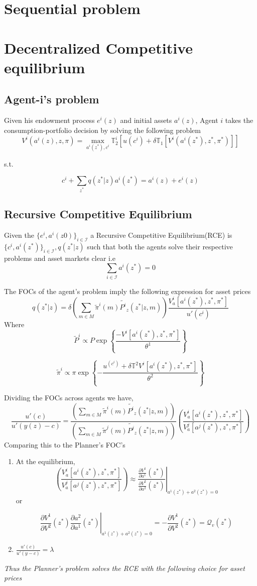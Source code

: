\documentclass[12pt]{article}
\begin{document}
\section{Sequential problem}
\section{Decentralized Competitive equilibrium}
\subsection{Agent-i's problem}
Given his endowment process $e^i(z)$ and initial assets $a^i(z)$, Agent $i$ takes the consumption-portfolio decision by solving the following problem
\[V^i(a^i(z),z,\pi)=\max_{a^i(z^*),c^i}\mathbb{T}^i_2\left[ u(c^i)+\delta\mathbb{T}_1\left[V^i(a^i(z^*),z^*,\pi^*)\right]\right]\]

s.t.

\[c^i+\sum_{z^*} q(z^* | z)a^i(z^*)=a^i(z)+e^i(z)\]

\subsection{Recursive Competitive Equilibrium}
\noindent Given the $\{e^i,a^i(z0)\}_{i\in\mathcal{I}}$ a Recursive Competitive Equilibrium(RCE) is $\{c^i,a^i(z^*)\}_{i \in \mathcal{I}}, q(z^*|z)$ such that both the agents solve their respective problems and asset markets clear i.e
\[\sum_{i \in \mathcal{I}}a^i(z^*)=0\]

\noindent The FOCs of the agent's problem imply the following expression for asset prices 
\[q(z^*|z)=\delta \left(\sum_{m \in M}\tilde{\pi}^i(m)\tilde{P^i}_z(z^* |z,m)\right)\frac{V^i_a[a^i(z^*),z^*,\pi^*]}{u'(c^i)}\]
Where
\[\tilde{P}^i  \propto P\exp\left\{\frac{-V^i[a^i(z^*),z^*,\pi^*]}{\theta^1}\right\}\]

\[\tilde{\pi}^i  \propto \pi \exp\left\{-\frac{ u^(c^i)+\delta \mathbb{T}^2 V^i[a^i(z^*),z^*,\pi^*] }{\theta^2}\right\} \]

Dividing the FOCs across agents we have,
\[\frac{u'(c)}{u'(y(z)-c)}=\frac{\left(\sum_{m \in M}\tilde{\pi}^i(m)\tilde{P^i}_z(z^* |z,m)\right)}{\left(\sum_{m \in M}\tilde{\pi}^j(m)\tilde{P^j}_z(z^* |z,m)\right)}\left(\frac{V^i_a[a^i(z^*),z^*,\pi^*]}{V^j_a[a^j(z^*),z^*,\pi^*]}\right)\]
Comparing this to the Planner's FOC's
\begin{enumerate}
\item At the equilibrium,
\[\left(\frac{V^i_a[a^i(z^*),z^*,\pi^*]}{V^j_a[a^j(z^*),z^*,\pi^*]}\right)\approx \left.\frac{\frac{\partial V^1}{\partial a^1}(z^*)}{\frac{\partial V^2}{\partial a^2}(z^*)}\right |_{a^1(z^*)+a^2(z^*)=0}\]
or

\[\left.\frac{\partial V^1}{\partial V^2}(z^*)\frac{\partial a^2}{\partial a^1}(z^*)\right |_{a^1(z^*)+a^2(z^*)=0}=-\frac{\partial V^1}{\partial V^2}(z^*)=\textbf{$\mathcal{Q}_v(z^*)$}\]
\item $\frac{u'(c)}{u'(y-c)}=\lambda $

\end{enumerate}
\emph{Thus the Planner's problem solves the RCE with the following choice for asset prices}
\end{document}
